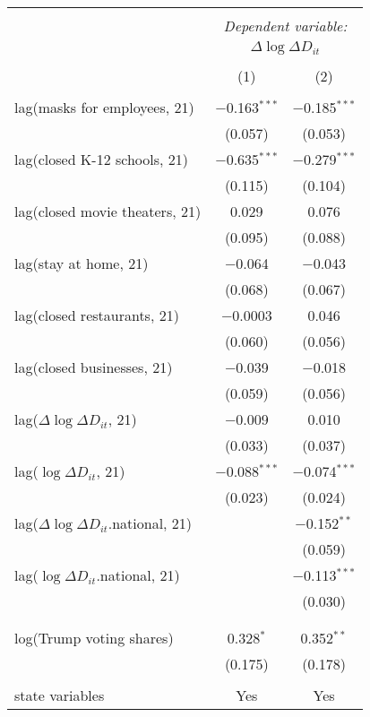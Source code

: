 \begin{tabular}{@{\extracolsep{1pt}}lcc} 
\\[-1.8ex]\hline 
\hline \\[-1.8ex] 
 & \multicolumn{2}{c}{\textit{Dependent variable:}} \\ 
\cline{2-3} 
 & \multicolumn{2}{c}{$\Delta \log \Delta D_{it}$} \\ 
\\[-1.8ex] & (1) & (2)\\ 
\hline \\[-1.8ex] 
 lag(masks for employees, 21) & $-$0.163$^{***}$ & $-$0.185$^{***}$ \\ 
  & (0.057) & (0.053) \\ 
  lag(closed K-12 schools, 21) & $-$0.635$^{***}$ & $-$0.279$^{***}$ \\ 
  & (0.115) & (0.104) \\ 
  lag(closed movie theaters, 21) & 0.029 & 0.076 \\ 
  & (0.095) & (0.088) \\ 
  lag(stay at home, 21) & $-$0.064 & $-$0.043 \\ 
  & (0.068) & (0.067) \\ 
  lag(closed restaurants, 21) & $-$0.0003 & 0.046 \\ 
  & (0.060) & (0.056) \\ 
  lag(closed businesses, 21) & $-$0.039 & $-$0.018 \\ 
  & (0.059) & (0.056) \\ 
  lag($\Delta \log \Delta D_{it}$, 21) & $-$0.009 & 0.010 \\ 
  & (0.033) & (0.037) \\ 
  lag($\log \Delta D_{it}$, 21) & $-$0.088$^{***}$ & $-$0.074$^{***}$ \\ 
  & (0.023) & (0.024) \\ 
  lag($\Delta \log \Delta D_{it}$.national, 21) &  & $-$0.152$^{**}$ \\ 
  &  & (0.059) \\ 
  lag($\log \Delta D_{it}$.national, 21) &  & $-$0.113$^{***}$ \\ 
  &  & (0.030) \\ 
   &  &  \\ 
  &  &  \\ 
  log(Trump voting shares) & 0.328$^{*}$ & 0.352$^{**}$ \\ 
  & (0.175) & (0.178) \\ 
 \hline \\[-1.8ex] 
state variables & Yes & Yes \\ 

\end{tabular}
